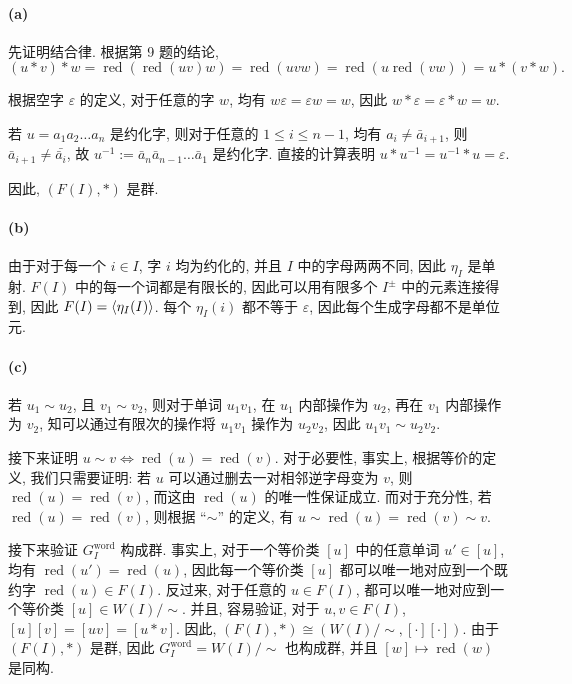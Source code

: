 \documentclass{article}
\begin{document}
\begin{solution}
	\paragraph{(a)} 先证明结合律. 根据第 9 题的结论, 
	\[ (u * v) * w = \operatorname{red}(\operatorname{red}(uv)w)
	=\operatorname{red}(uvw) = \operatorname{red}(u\operatorname{red}(vw))
	=u * (v * w). \]

	根据空字 $\varepsilon$ 的定义, 对于任意的字 $w$, 均有 $w\varepsilon = \varepsilon w = w$, 因此 $w*\varepsilon = \varepsilon*w = w$. 

	若 $u = a_1a_2\dots a_n$ 是约化字, 则对于任意的 $1\le i \le n-1$, 均有 $a_i \neq \bar{a}_{i+1}$, 则 $\bar{a}_{i+1} \neq \bar{\bar{a}_{i}}$, 故 $u^{-1} := \bar{a}_n\bar{a}_{n-1} \dots \bar{a}_1	$ 是约化字. 直接的计算表明 $u * u^{-1} = u^{-1} * u = \varepsilon$. 

	因此, $(F(I), *)$ 是群.

	\paragraph{(b)} 由于对于每一个 $i \in I$, 字 $i$ 均为约化的, 并且 $I$ 中的字母两两不同, 因此 $\eta_I$ 是单射. $F(I)$ 中的每一个词都是有限长的, 因此可以用有限多个 $I^{\pm}$ 中的元素连接得到, 因此 $F(I) = \left\langle \eta_I(I) \right\rangle$. 每个 $\eta_I(i)$ 都不等于 $\varepsilon$, 因此每个生成字母都不是单位元.

	\paragraph{(c)} 若 $u_1 \sim u_2$, 且 $v_1 \sim v_2$, 则对于单词 $u_1v_1$, 在 $u_1$ 内部操作为 $u_2$, 再在 $v_1$ 内部操作为 $v_2$, 知可以通过有限次的操作将 $u_1v_1$ 操作为 $u_2v_2$, 因此 $u_1v_1 \sim u_2v_2$. 

	接下来证明 $u \sim v \Longleftrightarrow \operatorname{red}(u) = \operatorname{red}(v)$. 对于必要性, 事实上, 根据等价的定义, 我们只需要证明: 若 $u$ 可以通过删去一对相邻逆字母变为 $v$, 则 $\operatorname{red}(u) = \operatorname{red}(v)$, 而这由 $\operatorname{red}(u)$ 的唯一性保证成立. 而对于充分性, 若 $\operatorname{red}(u) = \operatorname{red}(v)$, 则根据 ``$ \sim $'' 的定义, 有 $u \sim \operatorname{red}(u) = \operatorname{red}(v) \sim v$.

	接下来验证 $G_I^{\mathrm{word}}$ 构成群. 事实上, 对于一个等价类 $[u]$ 中的任意单词 $u' \in [u]$, 均有 $\operatorname{red}(u') = \operatorname{red}(u)$, 因此每一个等价类 $[u]$ 都可以唯一地对应到一个既约字 $\operatorname{red}(u) \in F(I)$. 反过来, 对于任意的 $u\in F(I)$, 都可以唯一地对应到一个等价类 $[u] \in W(I)/\sim$. 并且, 容易验证, 对于 $u,v \in F(I)$, $[u][v] = [uv] = [u * v]$. 因此, $(F(I),*) \cong (W(I)/\sim, [\cdot][\cdot])$. 由于 $(F(I), *)$ 是群, 因此 $G_I^{\mathrm{word}} = W(I)/\sim$ 也构成群, 并且 $[w] \mapsto \operatorname{red}(w)$ 是同构.


\end{solution}
\end{document}
